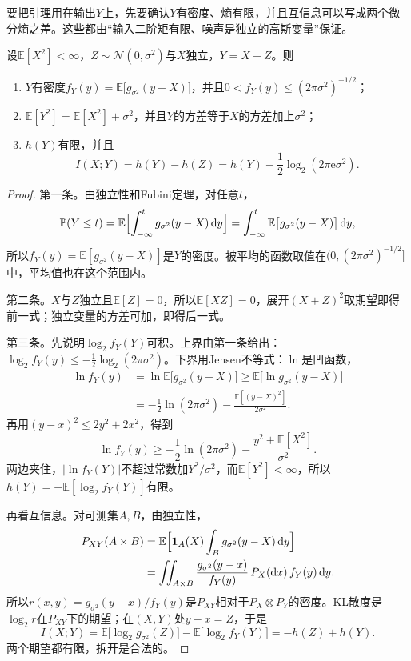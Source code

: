 要把引理用在输出$Y$上，先要确认$Y$有密度、熵有限，并且互信息可以写成两个微分熵之差。这些都由“输入二阶矩有限、噪声是独立的高斯变量”保证。

\begin{lemma}[输出的密度与互信息]
\label{lem:gcc-output}
设$\mathbb{E}[X^2]<\infty$，$Z\sim\mathcal{N}(0,\sigma^2)$与$X$独立，$Y=X+Z$。则
\begin{enumerate}
 \item $Y$有密度$f_Y(y)=\mathbb{E}\bigl[g_{\sigma^2}(y-X)\bigr]$，并且$0<f_Y(y)\leq(2\pi\sigma^2)^{-1/2}$；
 \item $\mathbb{E}[Y^2]=\mathbb{E}[X^2]+\sigma^2$，并且$Y$的方差等于$X$的方差加上$\sigma^2$；
 \item $h(Y)$有限，并且
 \begin{equation}
  I(X;Y)=h(Y)-h(Z)=h(Y)-\frac12\log_2(2\pi\mathrm{e}\sigma^2) .
  \label{eq:gcc-mi-entropy}
 \end{equation}
\end{enumerate}
\end{lemma}

\begin{proof}
第一条。由独立性和Fubini定理，对任意$t$，
\[
 \mathbb{P}(Y\leq t)=\mathbb{E}\Bigl[\int_{-\infty}^{t}g_{\sigma^2}(y-X)\,\mathrm{d}y\Bigr]
 =\int_{-\infty}^{t}\mathbb{E}\bigl[g_{\sigma^2}(y-X)\bigr]\,\mathrm{d}y ,
\]
所以$f_Y(y)=\mathbb{E}[g_{\sigma^2}(y-X)]$是$Y$的密度。被平均的函数取值在$(0,(2\pi\sigma^2)^{-1/2}]$中，平均值也在这个范围内。

第二条。$X$与$Z$独立且$\mathbb{E}[Z]=0$，所以$\mathbb{E}[XZ]=0$，展开$(X+Z)^2$取期望即得前一式；独立变量的方差可加，即得后一式。

第三条。先说明$\log_2f_Y(Y)$可积。上界由第一条给出：$\log_2f_Y(y)\leq-\frac12\log_2(2\pi\sigma^2)$。下界用Jensen不等式：$\ln$是凹函数，
\[
 \begin{aligned}
  \ln f_Y(y)&=\ln\mathbb{E}\bigl[g_{\sigma^2}(y-X)\bigr]\geq\mathbb{E}\bigl[\ln g_{\sigma^2}(y-X)\bigr]\\
  &=-\frac12\ln(2\pi\sigma^2)-\frac{\mathbb{E}[(y-X)^2]}{2\sigma^2} .
 \end{aligned}
\]
再用$(y-x)^2\leq2y^2+2x^2$，得到
\[
 \ln f_Y(y)\geq-\frac12\ln(2\pi\sigma^2)-\frac{y^2+\mathbb{E}[X^2]}{\sigma^2} .
\]
两边夹住，$\lvert\ln f_Y(Y)\rvert$不超过常数加$Y^2/\sigma^2$，而$\mathbb{E}[Y^2]<\infty$，所以$h(Y)=-\mathbb{E}[\log_2f_Y(Y)]$有限。

再看互信息。对可测集$A,B$，由独立性，
\[
 \begin{aligned}
  P_{XY}(A\times B)&=\mathbb{E}\Bigl[\mathbf{1}_{A}(X)\int_Bg_{\sigma^2}(y-X)\,\mathrm{d}y\Bigr]\\
  &=\iint_{A\times B}\frac{g_{\sigma^2}(y-x)}{f_Y(y)}\,P_X(\mathrm{d}x)\,f_Y(y)\,\mathrm{d}y .
 \end{aligned}
\]
所以$r(x,y)=g_{\sigma^2}(y-x)/f_Y(y)$是$P_{XY}$相对于$P_X\otimes P_Y$的密度。KL散度是$\log_2r$在$P_{XY}$下的期望；在$(X,Y)$处$y-x=Z$，于是
\[
 I(X;Y)=\mathbb{E}\bigl[\log_2g_{\sigma^2}(Z)\bigr]-\mathbb{E}\bigl[\log_2f_Y(Y)\bigr]=-h(Z)+h(Y) .
\]
两个期望都有限，拆开是合法的。
\end{proof}


